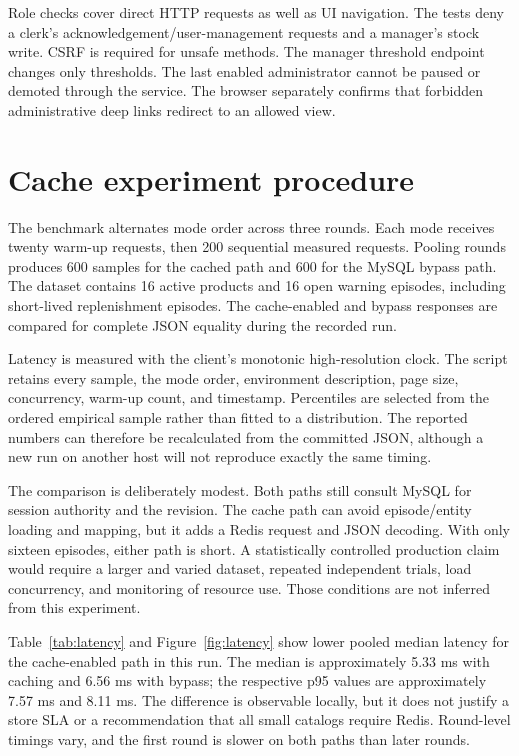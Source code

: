 Role checks cover direct HTTP requests as well as UI navigation. The tests deny a clerk's acknowledgement/user-management requests and a manager's stock write. CSRF is required for unsafe methods. The manager threshold endpoint changes only thresholds. The last enabled administrator cannot be paused or demoted through the service. The browser separately confirms that forbidden administrative deep links redirect to an allowed view.

\section{Cache experiment procedure}
The benchmark alternates mode order across three rounds. Each mode receives twenty warm-up requests, then 200 sequential measured requests. Pooling rounds produces 600 samples for the cached path and 600 for the MySQL bypass path. The dataset contains 16 active products and 16 open warning episodes, including short-lived replenishment episodes. The cache-enabled and bypass responses are compared for complete JSON equality during the recorded run.

Latency is measured with the client's monotonic high-resolution clock. The script retains every sample, the mode order, environment description, page size, concurrency, warm-up count, and timestamp. Percentiles are selected from the ordered empirical sample rather than fitted to a distribution. The reported numbers can therefore be recalculated from the committed JSON, although a new run on another host will not reproduce exactly the same timing.

The comparison is deliberately modest. Both paths still consult MySQL for session authority and the revision. The cache path can avoid episode/entity loading and mapping, but it adds a Redis request and JSON decoding. With only sixteen episodes, either path is short. A statistically controlled production claim would require a larger and varied dataset, repeated independent trials, load concurrency, and monitoring of resource use. Those conditions are not inferred from this experiment.



Table~\ref{tab:latency} and Figure~\ref{fig:latency} show lower pooled median latency for the cache-enabled path in this run. The median is approximately 5.33 ms with caching and 6.56 ms with bypass; the respective p95 values are approximately 7.57 ms and 8.11 ms. The difference is observable locally, but it does not justify a store SLA or a recommendation that all small catalogs require Redis. Round-level timings vary, and the first round is slower on both paths than later rounds.

